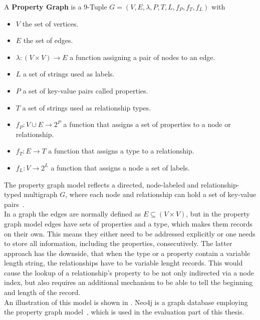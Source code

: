         A \textbf{Property Graph} is a 9-Tuple $G = (V, E, \lambda, P, T, L, f_P, f_T, f_L)$ with 
        \begin{itemize}
            \item $V$ the set of vertices.
            \item $E$ the set of edges.
            \item $\lambda: (V \times V) \rightarrow E$ a function assigning a pair of nodes to an edge.
            \item $L$ a set of strings used as labels.
            \item $P$ a set of key-value pairs called properties.
            \item $T$ a set of strings used as relationship types.
            \item $f_P: V \cup E \rightarrow 2^P$ a function that assigns a set of properties to a node or relationship.
            \item $f_T: E \rightarrow T$ a function that assigns a type to  a relationship.
            \item  $f_L: V \rightarrow 2^L$ a function that assigns a node a set of labels.
        \end{itemize} 
        \smallskip
        The property graph model reflects a directed, node-labeled and relationship-typed multigraph $G$, where each node and relationship can hold a set of key-value pairs~\cite{angles2018property}. \\
        In a graph the edges are normally defined as $E \subseteq (V \times V)$, but in the property graph model edges have sets of properties and a type, which makes them records on their own. 
        This means they either need to be addressed explicitly or one needs to store all information, including the properties, consecutively. 
        The latter approach has the downside, that when the type or a property contain a variable length string, the relationships have to be variable lenght records. 
        This would cause the lookup of a relationship's property to be not only indirected via a node index, but also requires an additional mechanism to be able to tell the beginning and length of the record. \\
        An illustration of this model is shown in .
        Neo4j is a graph database employing the property graph model~\cite{neo4j_book}, which is used in the evaluation part of this thesis.
    
